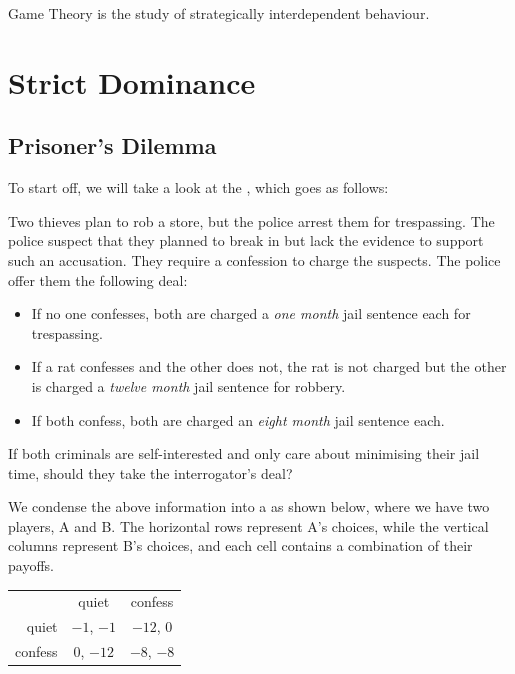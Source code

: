 Game Theory is the study of strategically interdependent behaviour.
\section{Strict Dominance}
\subsection{Prisoner's Dilemma}
To start off, we will take a look at the , which goes as follows:

\begin{ebox}
Two thieves plan to rob a store, but the police arrest them for trespassing. The police suspect that they planned to break in but lack the evidence to support such an accusation. They require a confession to charge the suspects. The police offer them the following deal:
\begin{itemize}
\item If no one confesses, both are charged a \emph{one month} jail sentence each for trespassing.
\item If a rat confesses and the other does not, the rat is not charged but the other is charged a \emph{twelve month} jail sentence for robbery.
\item If both confess, both are charged an \emph{eight month} jail sentence each.
\end{itemize}
If both criminals are self-interested and only care about minimising their jail time, should they take the interrogator's deal?
\end{ebox}

We condense the above information into a  as shown below, where we have two players, A and B. The horizontal rows represent A's choices, while the vertical columns represent B's choices, and each cell contains a combination of their payoffs.

\begin{table}[H]
\centering
\begin{tabular}{rcc}
\multicolumn{1}{l}{}         & quiet                       & confess                     \\ \cline{2-3} 
\multicolumn{1}{r|}{quiet}   & \multicolumn{1}{c|}{$-1$, $-1$} & \multicolumn{1}{c|}{$-12$, $0$} \\ \cline{2-3} 
\multicolumn{1}{r|}{confess} & \multicolumn{1}{c|}{$0$, $-12$} & \multicolumn{1}{c|}{$-8$, $-8$} \\ \cline{2-3} 
\end{tabular}
\end{table}

